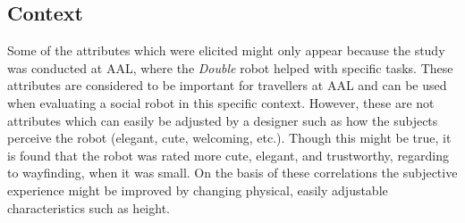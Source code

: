 \subsection{Context}
%
 Some of the attributes which were elicited might only appear because the study was conducted at AAL, where the \textit{Double} robot helped with specific tasks. These attributes are considered to be important for travellers at AAL and can be used when evaluating a social robot in this specific context. However, these are not attributes which can easily be adjusted by a designer such as how the subjects perceive the robot (elegant, cute, welcoming, etc.). Though this might be true, it is found that the robot was rated more cute, elegant, and trustworthy, regarding to wayfinding, when it was small. On the basis of these correlations the subjective experience might be improved by changing physical, easily adjustable characteristics such as height.

 
